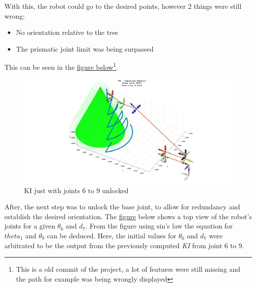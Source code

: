 \documentclass{report}
\begin{document}
With this, the robot could go to the desired points, however 2 things were still wrong:\begin{itemize}
    \item No orientation relative to the tree
    \item The prismatic joint limit was being surpassed
\end{itemize}

This can be seen in the \hyperref[fig:69]{figure below}\footnote{This is a old
    commit of the project, a lot of features were still missing and the path for
    example was being wrongly displayed}.

\begin{figure}[H]
    \centering
    \includegraphics[scale=0.2]{resources/69_no_orientation.jpg}
    \caption{\label{fig:69} KI just with joints 6 to 9 unlocked}
\end{figure}

After, the next step was to unlock the base joint, to allow for redundancy and
establish the desired orientation. The \hyperref[fig:theta_9]{figure} below
shows a top view of the robot's joints for a given $\theta_6$ and $d_7$. From
the figure using sin's law the equation for $theta_1$ and $\theta_9$ can be
deduced. Here, the initial values for $\theta_6$ and $d_7$ were arbitrated to be
the output from the previously computed \textit{KI} from joint 6 to 9.
\end{document}
